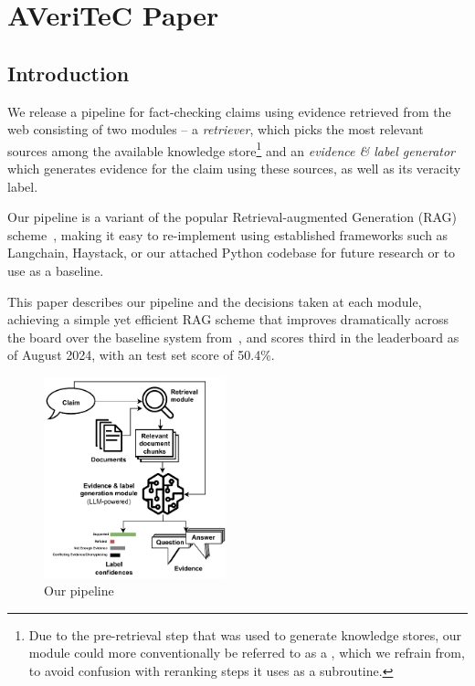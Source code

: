 
\chapter{AVeriTeC Paper}
\section{Introduction}
\label{sec:introduction}
We release {a} pipeline for fact-checking claims using evidence retrieved from the web consisting of two modules -- a \textit{retriever}, which picks the most relevant sources among the available knowledge store\footnote{Due to the pre-retrieval step that was used to generate knowledge stores, our  module could more conventionally be referred to as a , which we refrain from, to avoid confusion with reranking steps it uses as a subroutine.} and an \textit{evidence \& label generator} which generates evidence for the claim using these sources, as well as its veracity label. 

Our pipeline is a variant of the popular Retrieval-augmented Generation (RAG) scheme~\cite{rag}, making it easy to re-implement using established frameworks such as Langchain, Haystack, or our attached Python codebase for future research or to use as a baseline.

This paper describes our pipeline and the decisions taken at each module, achieving a simple yet efficient RAG scheme that improves dramatically across the board over the baseline system from~\cite{averitec2024}, and scores third in the \averitec{} leaderboard as of August 2024, with an \averitec{} test set score of 50.4\%.

\begin{figure}[h]
    \centering
    \includegraphics[width=0.47\textwidth]{figures/pipeline.pdf}
    \caption{Our pipeline}
    \label{fig:pipeline}
\end{figure}

